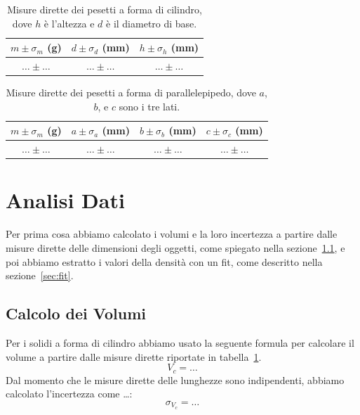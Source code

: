 \documentclass[a4paper]{article}
\begin{document}
\begin{table}[]
    \centering
    \begin{tabular}{c|c|c}
      $m\pm \sigma_m$ (g)   & $d\pm\sigma_d$ (mm)  & $h\pm\sigma_h$ (mm)\\
      \hline
     $\ldots \pm \ldots$    & $\ldots \pm \ldots$ &$\ldots \pm \ldots$\\
    \end{tabular}
    \caption{Misure dirette dei pesetti a forma di cilindro, dove $h$ \`e l'altezza e $d$ \`e il diametro di base.}
    \label{tab:dir_cilindri}
\end{table}

\begin{table}[]
    \centering
    \begin{tabular}{c|c|c|c}
      $m\pm \sigma_m$ (g)   & $a\pm\sigma_a$ (mm)  & $b\pm\sigma_b$ (mm)& $c\pm\sigma_c$ (mm)\\
      \hline
       $\ldots \pm \ldots$  & $\ldots \pm \ldots$ & $\ldots \pm \ldots$ & $\ldots \pm \ldots$\\
    \end{tabular}
    \caption{Misure dirette dei pesetti a forma di parallelepipedo, dove $a$, $b$, e $c$ sono i tre lati.}
    \label{tab:dir_parallelepipedi}
\end{table}


\section{Analisi Dati}
Per prima cosa abbiamo calcolato i volumi e la loro incertezza a partire dalle misure dirette delle dimensioni degli oggetti,
come spiegato nella sezione~\ref{sec:calcoloV}, e poi abbiamo estratto i valori della densit\`a con un fit,
come descritto nella sezione~\ref{sec:fit}.

\subsection{Calcolo dei Volumi}\label{sec:calcoloV}
Per i solidi a forma di cilindro abbiamo usato la seguente formula per calcolare il volume a partire dalle misure dirette riportate in tabella~\ref{tab:dir_cilindri}.
\begin{equation}
    V_c = \ldots
\end{equation}
Dal momento che le misure dirette delle lunghezze sono indipendenti, abbiamo calcolato l'incertezza come \ldots:
\begin{equation}
    \sigma_{V_c} = \ldots
\end{equation}
\end{document}
